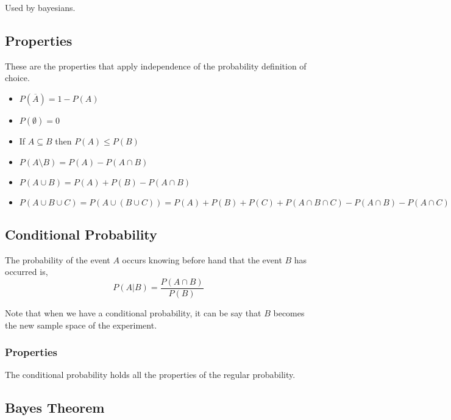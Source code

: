 Used by bayesians. 


\subsection{Properties} %
\label{sub:properties}

These are the properties that apply independence of the probability definition
of choice.
\begin{itemize}
    \item $P(\overline{A}) = 1 - P(A)$
    \item $P(\emptyset) = 0$
    \item If $A \subseteq B$ then $P(A) \leq P(B)$
    \item $P(A\setminus B) = P(A) - P(A \cap B)$
    \item $P(A \cup B) = P(A) + P(B) - P(A \cap B)$
    \item $P(A \cup B \cup C) = P(A \cup (B \cup C)) = P(A) + P(B) + P(C) +
    P(A\cap B \cap C) - P(A \cap B) - P(A \cap C) - P(B \cap C)$
\end{itemize}

\subsection{Conditional Probability} %
\label{sub:conditional_probability}

The probability of the event $A$ occurs knowing before hand that the event $B$
has occurred is,
\begin{equation*}
    P(A|B) = \dfrac{P(A\cap B)}{P(B)}
\end{equation*}

Note that when we have a conditional probability, it can be say that $B$ becomes
 the new sample space of the experiment.

\subsubsection{Properties} %
\label{ssub:properties}

The conditional probability holds all the properties of the regular probability.


\subsection{Bayes Theorem} %
\label{sub:bayes_theorem}


